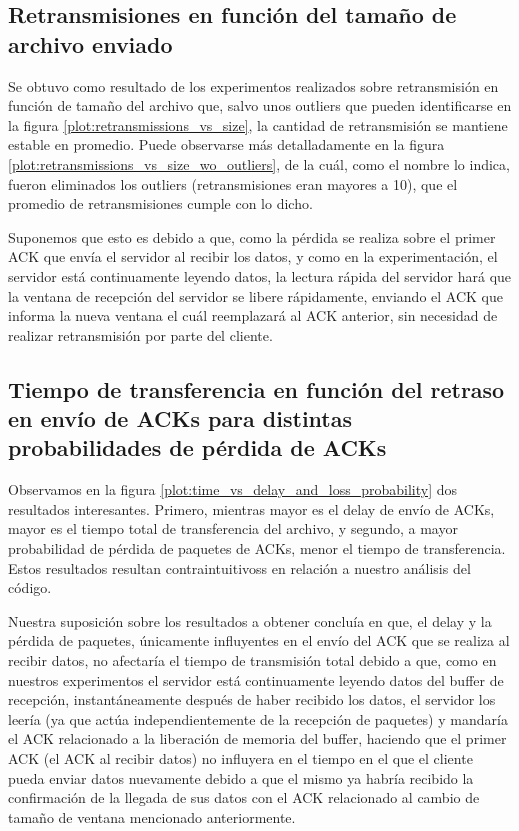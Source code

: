\documentclass[a4paper, 10pt, twoside]{article}
\begin{document}
\subsection{Retransmisiones en función del tamaño de archivo enviado}

Se obtuvo como resultado de los experimentos realizados sobre retransmisión en función de tamaño del archivo que, salvo unos outliers que pueden identificarse en la figura \ref{plot:retransmissions_vs_size}, la cantidad de retransmisión se mantiene estable en promedio. Puede observarse más detalladamente en la figura \ref{plot:retransmissions_vs_size_wo_outliers}, de la cuál, como el nombre lo indica, fueron eliminados los outliers (retransmisiones eran mayores a 10), que el promedio de retransmisiones cumple con lo dicho.

Suponemos que esto es debido a que, como la pérdida se realiza sobre el primer ACK que envía el servidor al recibir los datos, y como en la experimentación, el servidor está continuamente leyendo datos, la lectura rápida del servidor hará que la ventana de recepción del servidor se libere rápidamente, enviando el ACK que informa la nueva ventana el cuál reemplazará al ACK anterior, sin necesidad de realizar retransmisión por parte del cliente.

\subsection{Tiempo de transferencia en función del retraso en envío de ACKs para distintas probabilidades de pérdida de ACKs}

Observamos en la figura \ref{plot:time_vs_delay_and_loss_probability} dos resultados interesantes. Primero, mientras mayor es el delay de envío de ACKs, mayor es el tiempo total de transferencia del archivo, y segundo, a mayor probabilidad de pérdida de paquetes de ACKs, menor el tiempo de transferencia. Estos resultados resultan contraintuitivoss en relación a nuestro análisis del código. 

Nuestra suposición sobre los resultados a obtener concluía en que, el delay y la pérdida de paquetes, únicamente influyentes en el envío del ACK que se realiza al recibir datos, no afectaría el tiempo de transmisión total debido a que, como en nuestros experimentos el servidor está continuamente leyendo datos del buffer de recepción, instantáneamente después de haber recibido los datos, el servidor los leería (ya que actúa independientemente de la recepción de paquetes) y mandaría el ACK relacionado a la liberación de memoria del buffer, haciendo que el primer ACK (el ACK al recibir datos) no influyera en el tiempo en el que el cliente pueda enviar datos nuevamente debido a que el mismo ya habría recibido la confirmación de la llegada de sus datos con el ACK relacionado al cambio de tamaño de ventana mencionado anteriormente.
\end{document}
